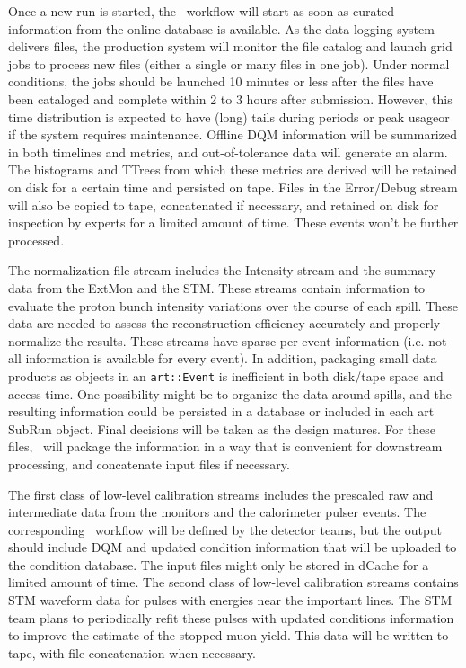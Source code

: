Once a new run is started, the \passone\ workflow will start as soon as curated information from the online database is available. As the data logging system delivers files, the production system will monitor the file catalog and launch grid jobs to process new files (either a single or many files in one job). Under normal conditions, the jobs should be launched 10 minutes or less after the files have been cataloged and complete within 2 to 3 hours after submission. However, this time distribution is expected to have (long) tails during periods or peak usageor if the system requires maintenance. Offline DQM information will be summarized in both timelines and metrics, and out-of-tolerance data will generate an alarm. The histograms and TTrees from which these metrics are derived will be retained on disk for a certain time and persisted on tape. Files in the Error/Debug stream will also be copied to tape, concatenated if necessary, and retained on disk for inspection by experts for a limited amount of time. These events won't be further processed.

The normalization file stream includes the Intensity stream and the summary data from the ExtMon and the STM. These streams contain information to evaluate the proton bunch intensity variations over the course of each spill. These data are needed to assess the reconstruction efficiency accurately and properly normalize the results. These streams have sparse per-event information (i.e. not all information is available for every event). In addition, packaging small data products as objects in an {\tt art::Event} is inefficient in both disk/tape space and access time. One possibility might be to organize the data around spills, and the resulting information could be persisted in a database or included in each art SubRun object. Final decisions will be taken as the design matures. For these files, \passone\ will package the information in a way that is convenient for downstream processing, and concatenate input files if necessary.

The first class of low-level calibration streams includes the prescaled raw and intermediate data from the monitors and the calorimeter pulser events. The corresponding \passone\ workflow will be defined by the detector teams, but the output should include DQM and updated condition information that will be uploaded to the condition database. The input files might only be stored in dCache for a limited amount of time. The second class of low-level calibration streams contains STM waveform data for pulses with energies near the important lines. The STM team plans to periodically refit these pulses with updated conditions information to improve the estimate of the stopped muon yield. This data will be written to tape, with file concatenation when necessary.


